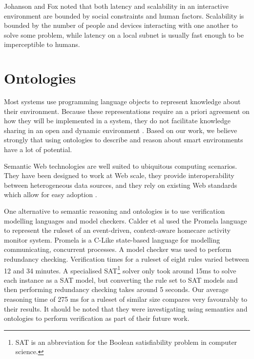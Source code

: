 Johanson and Fox \cite{Johanson2002} noted that both latency and scalability in an interactive environment are bounded by social constraints and human factors. Scalability is bounded by the number of people and devices interacting with one another to solve some problem, while latency on a local subnet is usually fast enough to be imperceptible to humans.





\section{Ontologies}

Most systems use programming language objects to represent knowledge about their environment. Because these representations require an a priori agreement on how they will be implemented in a system, they do not facilitate knowledge sharing in an open and dynamic environment \cite{Chen2004}. Based on our work, we believe strongly that using ontologies to describe and reason about smart environments have a lot of potential.  
	
Semantic Web technologies are well suited to ubiquitous computing scenarios. They have been designed to work at Web scale, they provide interoperability between heterogeneous data sources, and they rely on existing Web standards which allow for easy adoption \cite{Sabou2010}.

One alternative to semantic reasoning and ontologies is to use verification modelling languages and model checkers. Calder et al \cite{Calder2009} used the Promela language to represent the ruleset of an event-driven, context-aware homecare activity monitor system. Promela is a C-Like state-based language for modelling communicating, concurrent processes. A model checker was used to perform redundancy checking. Verification times for a ruleset of eight rules varied between 12 and 34 minutes. A specialised SAT\footnote{SAT is an abbreviation for the Boolean satisfiability problem in computer science.} solver only took around 15ms to solve each instance as a SAT model, but converting the rule set to SAT models and then performing redundancy checking takes around 5 seconds.
 Our average reasoning time of 275 ms for a ruleset of similar size compares very favourably to their results. It should be noted that they were investigating using semantics and ontologies to perform verification as part of their future work.





